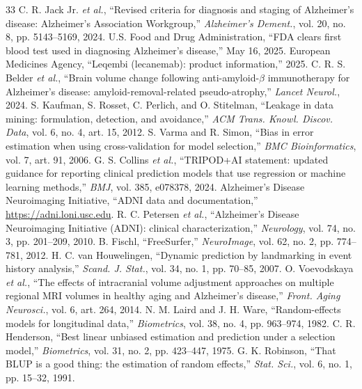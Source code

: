 \documentclass[journal]{IEEEtran}
\begin{document}
\begin{thebibliography}{33}
 C. R. Jack Jr. \emph{et al.}, ``Revised criteria for diagnosis and staging of Alzheimer's disease: Alzheimer's Association Workgroup,'' \emph{Alzheimer's Dement.}, vol. 20, no. 8, pp. 5143--5169, 2024.
 U.S. Food and Drug Administration, ``FDA clears first blood test used in diagnosing Alzheimer's disease,'' May 16, 2025.
 European Medicines Agency, ``Leqembi (lecanemab): product information,'' 2025.
 C. R. S. Belder \emph{et al.}, ``Brain volume change following anti-amyloid-$\beta$ immunotherapy for Alzheimer's disease: amyloid-removal-related pseudo-atrophy,'' \emph{Lancet Neurol.}, 2024.
 S. Kaufman, S. Rosset, C. Perlich, and O. Stitelman, ``Leakage in data mining: formulation, detection, and avoidance,'' \emph{ACM Trans. Knowl. Discov. Data}, vol. 6, no. 4, art. 15, 2012.
 S. Varma and R. Simon, ``Bias in error estimation when using cross-validation for model selection,'' \emph{BMC Bioinformatics}, vol. 7, art. 91, 2006.
 G. S. Collins \emph{et al.}, ``TRIPOD+AI statement: updated guidance for reporting clinical prediction models that use regression or machine learning methods,'' \emph{BMJ}, vol. 385, e078378, 2024.
 Alzheimer's Disease Neuroimaging Initiative, ``ADNI data and documentation,'' \url{https://adni.loni.usc.edu}.
 R. C. Petersen \emph{et al.}, ``Alzheimer's Disease Neuroimaging Initiative (ADNI): clinical characterization,'' \emph{Neurology}, vol. 74, no. 3, pp. 201--209, 2010.
 B. Fischl, ``FreeSurfer,'' \emph{NeuroImage}, vol. 62, no. 2, pp. 774--781, 2012.
 H. C. van Houwelingen, ``Dynamic prediction by landmarking in event history analysis,'' \emph{Scand. J. Stat.}, vol. 34, no. 1, pp. 70--85, 2007.
 O. Voevodskaya \emph{et al.}, ``The effects of intracranial volume adjustment approaches on multiple regional MRI volumes in healthy aging and Alzheimer's disease,'' \emph{Front. Aging Neurosci.}, vol. 6, art. 264, 2014.
 N. M. Laird and J. H. Ware, ``Random-effects models for longitudinal data,'' \emph{Biometrics}, vol. 38, no. 4, pp. 963--974, 1982.
 C. R. Henderson, ``Best linear unbiased estimation and prediction under a selection model,'' \emph{Biometrics}, vol. 31, no. 2, pp. 423--447, 1975.
 G. K. Robinson, ``That BLUP is a good thing: the estimation of random effects,'' \emph{Stat. Sci.}, vol. 6, no. 1, pp. 15--32, 1991.

\end{thebibliography}
\end{document}
